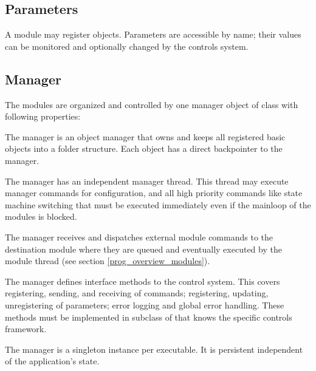 \subsection{Parameters}
A module may register  objects. Parameters are 
   accessible by name; their values can be monitored and optionally changed by 
   the controls system. 
\subsection{Manager}
The modules are organized and controlled by one manager object of class  with following
properties: 
\bcir
\item  The manager is an object manager that owns and keeps all 
      registered basic objects into a folder structure. Each object 
      has a direct backpointer to the manager. 
\item  The manager has an independent manager thread. 
      This thread may execute manager commands for configuration, 
      and all high priority commands like state machine switching 
      that must be executed immediately even if the mainloop of the modules is blocked.
\item  The manager receives and dispatches external module commands 
      to the destination module where they are queued and eventually executed 
      by the module thread (see section \ref{prog_overview_modules}).
\item  The manager defines interface methods to the control system. 
      This covers registering, sending, and receiving of commands; registering, 
      updating, unregistering of parameters; error logging and global error handling. 
      These methods must be implemented in subclass of  that 
      knows the specific controls framework.
\item  The manager is a singleton instance per executable. 
      It is persistent independent of the application's state.
\ecir
